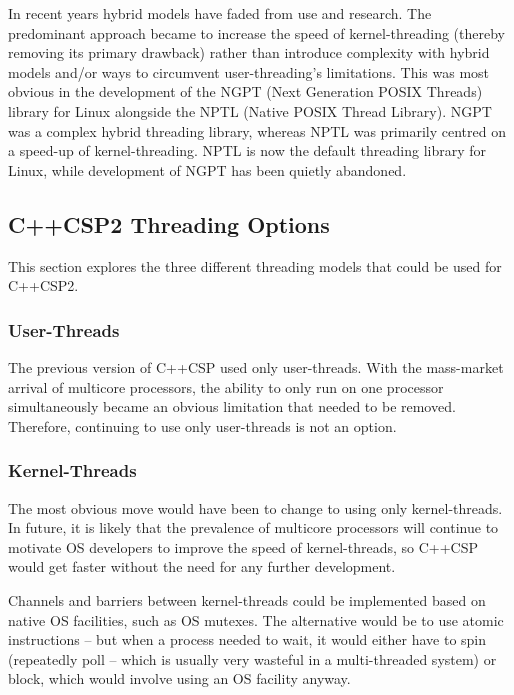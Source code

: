 \documentclass[12pt]{IOS-Book-Article-CPA-2007}
\begin{document}
In recent years hybrid models have faded from use and research.  The predominant approach became to increase the speed of kernel-threading (thereby removing
its primary drawback) rather than introduce complexity with hybrid models and/or ways to circumvent user-threading's limitations.  This was most obvious in the 
development of the NGPT (Next Generation POSIX Threads) library for Linux alongside the NPTL (Native POSIX Thread Library).  NGPT was a complex hybrid
threading library, whereas NPTL was primarily centred on a speed-up of kernel-threading.  NPTL is now the default threading library for Linux, while
development of NGPT has been quietly abandoned.

\subsection{C++CSP2 Threading Options}

This section explores the three different threading models that could be used for C++CSP2.

\subsubsection{User-Threads}

The previous
version of C++CSP used only user-threads.  With the mass-market arrival of multicore processors, the ability to only run on one processor simultaneously 
became an obvious limitation that needed to be removed.  Therefore, continuing to use only user-threads is not an option.

\subsubsection{Kernel-Threads}

The most obvious move would have been to change to using only kernel-threads.  In future, it is likely that the prevalence of multicore processors will
continue to motivate OS developers to improve the speed of kernel-threads, so C++CSP would get faster without the need for any further development.

Channels and barriers between kernel-threads could be implemented based on native OS facilities, such as OS mutexes.  The alternative would be to use
atomic instructions -- but when a process needed to wait, it would either have to spin (repeatedly poll -- which is usually very wasteful in a multi-threaded system) or block,
which would involve using an OS facility anyway.
\end{document}
